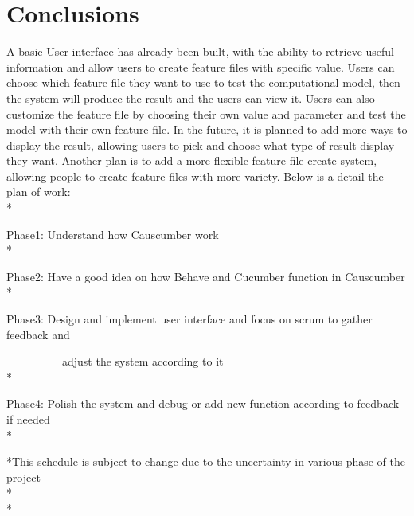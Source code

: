 \chapter{Conclusions}

A basic User interface has already been built, with the ability to retrieve useful information and allow users to create feature files with specific value. Users can choose which feature file they want to use to test the computational model, then the system will produce the result and the users can view it. Users can also customize the feature file by choosing their own value and parameter and test the model with their own feature file. In the future, it is planned to add more ways to display the result, allowing users to pick and choose what type of result display they want. Another plan is to add a more flexible feature file create system, allowing people to create feature files with more variety. Below is a detail the plan of work:\\*

Phase1: Understand how Causcumber work\\*

Phase2: Have a good idea on how Behave and Cucumber function in Causcumber\\*

Phase3: Design and implement user interface and focus on scrum to gather feedback and \space 

~~~~~~ ~ ~ adjust the system according to it\\*

Phase4: Polish the system and debug or add new function according to feedback if needed\\*

*This schedule is subject to change due to the uncertainty in various phase of the project\\*\\*


